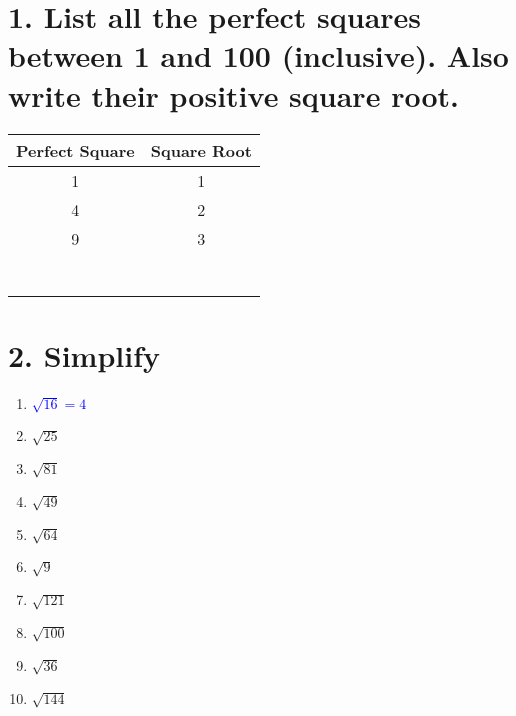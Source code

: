 \documentclass[12pt]{article}
\newcommand{\studentworkspace}{\vspace{1.5cm}}
\begin{document}
\section*{\normalsize 1. List all the perfect squares between 1 and 100 (inclusive). Also write their positive square root.}
\renewcommand{\arraystretch}{2} %
\begin{center}
\begin{tabular}{|c|c|}
    \hline
    Perfect Square & Square Root \\
    \hline
    1 & 1 \\
    \hline
    4 & 2 \\
    \hline
    9 & 3 \\
    \hline
    & \\
    \hline
    & \\
    \hline
    & \\
    \hline
    & \\
    \hline
    & \\
    \hline
    & \\
    \hline
    & \\
    \hline
\end{tabular}
\end{center}


\section*{\normalsize 2. Simplify}
\begin{enumerate}[label=\alph*.]
    \item \textcolor{blue}{$\sqrt{16} = 4$}
        \studentworkspace
    \item $\sqrt{25}$
        \studentworkspace
    \item $\sqrt{81}$
        \studentworkspace
    \item $\sqrt{49}$
        \studentworkspace
    \item $\sqrt{64}$
        \studentworkspace
    \item $\sqrt{9}$
        \studentworkspace
    \item $\sqrt{121}$
        \studentworkspace
    \item $\sqrt{100}$
        \studentworkspace
    \item $\sqrt{36}$
        \studentworkspace
    \item $\sqrt{144}$
        \studentworkspace
\end{enumerate}
\end{document}
